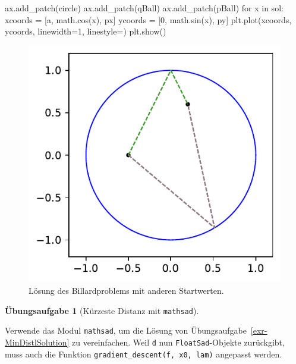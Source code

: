 \documentclass[
  a4paper,
  DIV=11]{scrreprt}
\newenvironment{Shaded}{\begin{snugshade}}{\end{snugshade}}
\newcommand{\ControlFlowTok}[1]{\textcolor[rgb]{0.00,0.23,0.31}{#1}}
\newcommand{\DecValTok}[1]{\textcolor[rgb]{0.68,0.00,0.00}{#1}}
\newcommand{\KeywordTok}[1]{\textcolor[rgb]{0.00,0.23,0.31}{#1}}
\newcommand{\NormalTok}[1]{\textcolor[rgb]{0.00,0.23,0.31}{#1}}
\newcommand{\OperatorTok}[1]{\textcolor[rgb]{0.37,0.37,0.37}{#1}}
\newcommand{\StringTok}[1]{\textcolor[rgb]{0.13,0.47,0.30}{#1}}
\theoremstyle{definition}
\newtheorem{exercise}{Übungsaufgabe}[chapter]
\theoremstyle{definition}
\theoremstyle{remark}
\begin{document}
\begin{tcolorbox}
\begin{Shaded}
\begin{Highlighting}[]
\NormalTok{ax.add\_patch(circle)}
\NormalTok{ax.add\_patch(qBall)}
\NormalTok{ax.add\_patch(pBall)}
\ControlFlowTok{for}\NormalTok{ x }\KeywordTok{in}\NormalTok{ sol:}
\NormalTok{    xcoords }\OperatorTok{=}\NormalTok{ [a, math.cos(x), px]}
\NormalTok{    ycoords }\OperatorTok{=}\NormalTok{ [}\DecValTok{0}\NormalTok{, math.sin(x), py]}
\NormalTok{    plt.plot(xcoords, ycoords, linewidth}\OperatorTok{=}\DecValTok{1}\NormalTok{, linestyle}\OperatorTok{=}\StringTok{\textquotesingle{}{-}{-}\textquotesingle{}}\NormalTok{)}
\NormalTok{plt.show()}
\end{Highlighting}
\end{Shaded}

\begin{figure}[H]

{\centering \includegraphics{ADOneDimManually_files/figure-pdf/fig-billardproblemsolutionwithmathsad-output-1.pdf}

}

\caption{\label{fig-billardproblemsolutionwithmathsad}Lösung des
Billardproblems mit anderen Startwerten.}

\end{figure}

\end{tcolorbox}

\begin{exercise}[Kürzeste Distanz mit
\texttt{mathsad}]\protect\hypertarget{exr-minDistSolutionWithSAD}{}\label{exr-minDistSolutionWithSAD}

Verwende das Modul \texttt{mathsad}, um die Lösung von
Übungsaufgabe~\ref{exr-MinDistlSolution} zu vereinfachen. Weil
\texttt{d} nun \texttt{FloatSad}-Objekte zurückgibt, muss auch die
Funktion \texttt{gradient\_descent(f,\ x0,\ lam)} angepasst werden.

\end{exercise}
\end{document}
